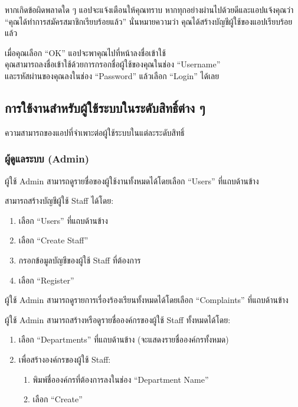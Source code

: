 หากเกิดข้อผิดพลาดใด ๆ แอปจะแจ้งเตือนให้คุณทราบ
หากทุกอย่างผ่านไปด้วยดีและแอปแจ้งคุณว่า ``คุณได้ทำการสมัครสมาชิกเรียบร้อยแล้ว'' นั่นหมายความว่า คุณได้สร้างบัญชีผู้ใช้ของแอปเรียบร้อยแล้ว

เมื่อคุณเลือก ``OK'' แอปจะพาคุณไปที่หน้าลงชื่อเข้าใช้\\
คุณสามารถลงชื่อเข้าใช้ด้วยการกรอกชื่อผู้ใช้ของคุณในช่อง ``Username''\\
และรหัสผ่านของคุณลงในช่อง ``Password'' แล้วเลือก ``Login'' ได้เลย

\pagebreak[4]

\subsection{การใช้งานสำหรับผู้ใช้ระบบในระดับสิทธิ์ต่าง ๆ}\label{subsec:role-specific-usage}

ความสามารถของแอปที่จำเพาะต่อผู้ใช้ระบบในแต่ละระดับสิทธิ์

\subsubsection{ผู้ดูแลระบบ (Admin)}\label{subsubsec:role-usage-admin}

ผู้ใช้ Admin สามารถดูรายชื่อของผู้ใช้งานทั้งหมดได้โดยเลือก ``Users'' ที่แถบด้านข้าง


สามารถสร้างบัญชีผู้ใช้ Staff ได้โดย:

\begin{enumerate}
    \item เลือก ``Users'' ที่แถบด้านข้าง
    \item เลือก ``Create Staff''
    \item กรอกข้อมูลบัญชีของผู้ใช้ Staff ที่ต้องการ
    \item เลือก ``Register''
\end{enumerate}


ผู้ใช้ Admin สามารถดูรายการเรื่องร้องเรียนทั้งหมดได้โดยเลือก ``Complaints'' ที่แถบด้านข้าง


ผู้ใช้ Admin สามารถสร้างหรือดูรายชื่อองค์กรของผู้ใช้ Staff ทั้งหมดได้โดย:

\begin{enumerate}
    \item เลือก ``Departments'' ที่แถบด้านข้าง (จะแสดงรายชื่อองค์กรทั้งหมด)
    \item เพื่อสร้างองค์กรของผู้ใช้ Staff:
        \begin{enumerate}
            \item พิมพ์ชื่อองค์กรที่ต้องการลงในช่อง ``Department Name''
            \item เลือก ``Create''
        \end{enumerate}
\end{enumerate}

